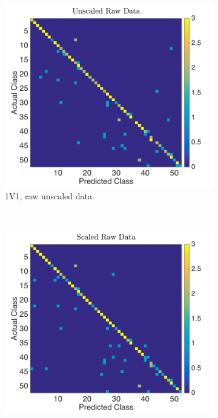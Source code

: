 \documentclass[a4paper, 10pt, conference]{ieeeconf}
\begin{document}
\begin{figure}[!ht]
	\captionsetup[subfigure]{position=b}
        \centering
        \begin{subfigure}{0.23\textwidth}
                \includegraphics[width=\textwidth]{src/1v1_raw_unscaled.png}
                \caption{1V1, raw unscaled data.}
        \end{subfigure}
        ~
        \begin{subfigure}{0.23\textwidth}
          \includegraphics[width=\textwidth]{src/1v1_raw_scaled.png}

\end{subfigure}
\end{figure}
\end{document}
